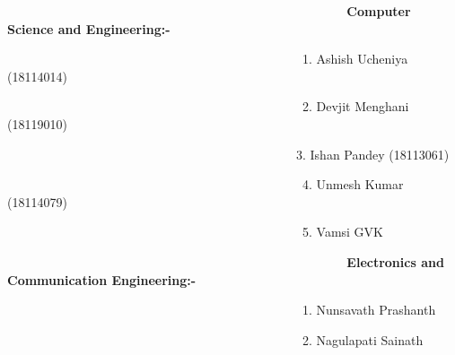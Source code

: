 \documentclass[12pt]{article}
\begin{document}
{\fontsize{15pt}{18.0pt}\selectfont \textbf{\ \ \ \ \ \ \ \ \ \ \ \ \ \ \ \ \ \ \ \ \ \ \ \ \ \ \ \ \ \ \ \ \ \ \ \ \ \ \ \ \ \ \ \ \ \ \  Computer Science and Engineering:-}\par}\par

{\fontsize{15pt}{18.0pt}\selectfont \ \ \ \ \ \ \ \ \ \ \ \ \ \ \ \ \ \ \ \ \ \ \ \ \ \ \ \ \ \ \ \ \ \ \ \ \ \ \ \ \ \ \ \ \ \ \  1. Ashish Ucheniya (18114014)\par}\par

{\fontsize{15pt}{18.0pt}\selectfont \ \ \ \ \ \ \ \ \ \ \ \ \ \ \ \ \ \ \ \ \ \ \ \ \ \ \ \ \ \ \ \ \ \ \ \ \ \ \ \ \ \ \ \ \ \ \  2. Devjit Menghani (18119010)\par}\par

{\fontsize{15pt}{18.0pt}\selectfont \ \ \ \ \ \ \ \ \ \ \ \ \ \ \ \ \ \ \ \ \ \ \ \ \ \ \ \ \ \ \  \ \ \ \ \ \ \ \ \ \ \ \ \ \ \  3. Ishan Pandey (18113061)\par}\par

{\fontsize{15pt}{18.0pt}\selectfont \ \ \ \ \ \ \ \ \ \ \ \ \ \ \ \ \ \ \ \ \ \ \ \ \ \ \ \ \ \ \ \ \ \ \ \ \ \ \ \ \ \ \ \ \ \ \  4. Unmesh Kumar (18114079)\par}\par

{\fontsize{15pt}{18.0pt}\selectfont \ \ \ \ \ \ \ \ \ \ \ \ \ \ \ \ \ \ \ \ \ \ \ \ \ \ \ \ \ \ \ \ \ \ \ \ \ \ \ \ \ \ \ \ \ \ \  5. Vamsi GVK\par}\par


\vspace{\baselineskip}
{\fontsize{15pt}{18.0pt}\selectfont \textbf{\ \ \ \ \ \ \ \ \ \ \ \ \ \ \ \ \ \ \ \ \ \ \ \ \ \ \ \ \ \ \ \ \ \ \ \ \ \ \ \ \ \ \ \ \ \ \  Electronics and Communication Engineering:-}\par}\par

{\fontsize{15pt}{18.0pt}\selectfont \ \ \ \ \ \ \ \ \ \ \ \ \ \ \ \ \ \ \ \ \ \ \ \ \ \ \ \ \ \ \ \ \ \ \ \ \ \ \ \ \ \ \ \ \ \ \  1. Nunsavath Prashanth\par}\par

{\fontsize{15pt}{18.0pt}\selectfont \ \ \ \ \ \ \ \ \ \ \ \ \ \ \ \ \ \ \ \ \ \ \ \ \ \ \ \ \ \ \ \ \ \ \ \ \ \ \ \ \ \ \ \ \ \ \  2. Nagulapati Sainath\par}\par
\end{document}
